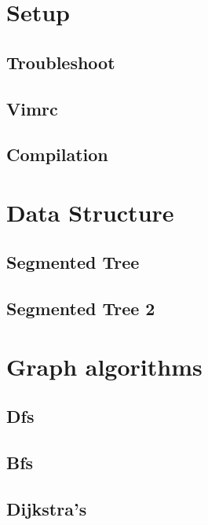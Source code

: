 \section{Setup}
\subsection{Troubleshoot}
\raggedbottom
\hrulefill
\subsection{Vimrc}
\raggedbottom
\hrulefill
\subsection{Compilation}
\raggedbottom
\hrulefill


\section{Data Structure}
\subsection{Segmented Tree}
\raggedbottom
\hrulefill
\subsection{Segmented Tree 2}
\raggedbottom
\hrulefill

\section{Graph algorithms}
\subsection{Dfs}
\raggedbottom
\hrulefill
\subsection{Bfs}
\raggedbottom
\hrulefill
\subsection{Dijkstra's}
\raggedbottom
\hrulefill
